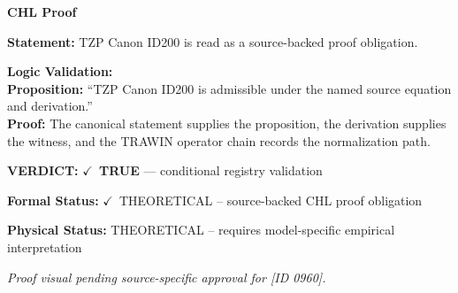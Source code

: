 \vspace{0.45em}
\noindent\textbf{CHL Proof}\par
\textbf{Statement:} TZP Canon ID200 is read as a source-backed proof obligation.

\textbf{Logic Validation:}\\
\textbf{Proposition:} ``TZP Canon ID200 is admissible under the named source equation and derivation.''\\
\textbf{Proof:} The canonical statement supplies the proposition, the derivation supplies the witness, and the TRAWIN operator chain records the normalization path.

\textbf{VERDICT:} \ensuremath{\checkmark}\ \textbf{TRUE} --- conditional registry validation

\textbf{Formal Status:} \ensuremath{\checkmark}\ THEORETICAL -- source-backed CHL proof obligation

\textbf{Physical Status:} THEORETICAL -- requires model-specific empirical interpretation
\par\vspace{0.45em}
\par
\vfill
\begingroup\footnotesize\itshape
Proof visual pending source-specific approval for [ID 0960].
\par\endgroup
\vfill
\endgroup
\endgroup
